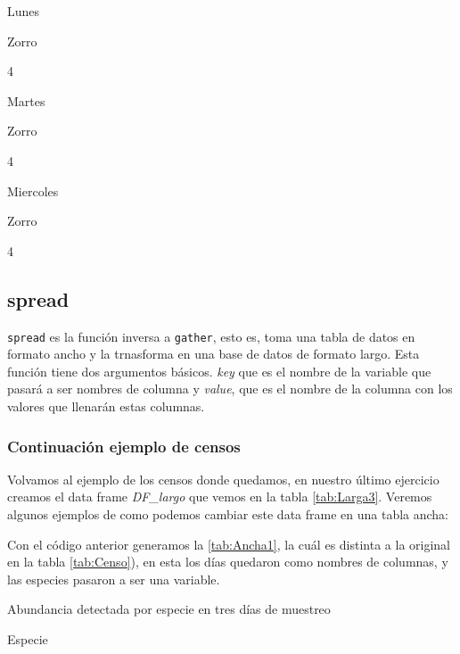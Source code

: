 \documentclass[]{book}
\newenvironment{Shaded}{\begin{snugshade}}{\end{snugshade}}
\newcommand{\DataTypeTok}[1]{\textcolor[rgb]{0.13,0.29,0.53}{#1}}
\newcommand{\KeywordTok}[1]{\textcolor[rgb]{0.13,0.29,0.53}{\textbf{#1}}}
\newcommand{\NormalTok}[1]{#1}
\newcommand{\OperatorTok}[1]{\textcolor[rgb]{0.81,0.36,0.00}{\textbf{#1}}}
\newcommand{\StringTok}[1]{\textcolor[rgb]{0.31,0.60,0.02}{#1}}
\begin{document}
Lunes

Zorro

4

Martes

Zorro

4

Miercoles

Zorro

4

\hypertarget{spread}{%
\subsection{spread}\label{spread}}

\texttt{spread} es la función inversa a \texttt{gather}, esto es, toma
una tabla de datos en formato ancho y la trnasforma en una base de datos
de formato largo. Esta función tiene dos argumentos básicos. \emph{key}
que es el nombre de la variable que pasará a ser nombres de columna y
\emph{value}, que es el nombre de la columna con los valores que
llenarán estas columnas.

\hypertarget{continuacion-ejemplo-de-censos}{%
\subsubsection{Continuación ejemplo de
censos}\label{continuacion-ejemplo-de-censos}}

Volvamos al ejemplo de los censos donde quedamos, en nuestro último
ejercicio creamos el data frame \emph{DF\_largo} que vemos en la tabla
\ref{tab:Larga3}. Veremos algunos ejemplos de como podemos cambiar este
data frame en una tabla ancha:

\begin{Shaded}
\end{Shaded}

Con el código anterior generamos la \ref{tab:Ancha1}, la cuál es
distinta a la original en la tabla \ref{tab:Censo}), en esta los días
quedaron como nombres de columnas, y las especies pasaron a ser una
variable.

\label{tab:Ancha1}Abundancia detectada por especie en tres días de muestreo

Especie
\end{document}
